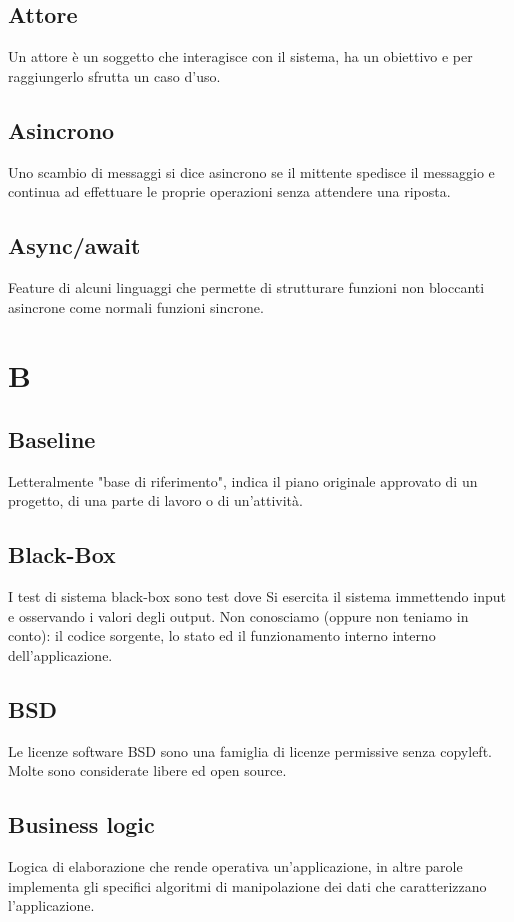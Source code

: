 \subsection*{Attore}
Un attore è un soggetto che interagisce con il sistema, ha un obiettivo e per raggiungerlo sfrutta un caso d'uso\glo. 

\subsection*{Asincrono}
Uno scambio di messaggi si dice asincrono se il mittente spedisce il messaggio e continua ad effettuare le proprie operazioni senza attendere una riposta.

\subsection*{Async/await}
Feature di alcuni linguaggi che permette di strutturare funzioni non bloccanti asincrone come normali funzioni sincrone.

\clearpage
\section*{B}

\subsection*{Baseline}
Letteralmente "base di riferimento", indica il piano originale approvato di un progetto, di una parte di lavoro o di un'attività.

\subsection*{Black-Box}
I test di sistema black-box sono test dove Si esercita il sistema immettendo input e osservando i valori degli output.
Non conosciamo (oppure non teniamo in conto):
il codice sorgente, lo stato ed il funzionamento interno interno dell’applicazione.

\subsection*{BSD}
Le licenze software BSD sono una famiglia di licenze permissive senza copyleft. Molte sono considerate libere ed open source.

\subsection*{Business logic}
Logica di elaborazione che rende operativa un'applicazione, in altre parole implementa gli specifici algoritmi di manipolazione dei dati che caratterizzano l’applicazione.

